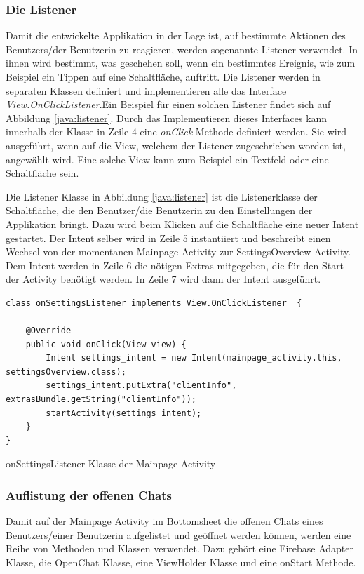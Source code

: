 \documentclass[a4paper,11pt]{report}
\newenvironment{code}{\captionsetup{type=figure}}{}
\begin{document}
			\subsubsection{Die Listener}
			Damit die entwickelte Applikation in der Lage ist, auf bestimmte Aktionen des Benutzers/der Benutzerin zu reagieren, werden sogenannte Listener verwendet. In ihnen wird bestimmt, was geschehen soll, wenn ein bestimmtes Ereignis, wie zum Beispiel ein Tippen auf eine Schaltfläche, auftritt. Die Listener werden in separaten Klassen definiert und implementieren alle das Interface \emph{View.OnClickListener}.Ein Beispiel für einen solchen Listener findet sich auf Abbildung \ref{java:listener}. Durch das Implementieren dieses Interfaces kann innerhalb der Klasse in Zeile 4 eine \emph{onClick} Methode definiert werden. Sie wird ausgeführt, wenn auf die View, welchem der Listener zugeschrieben worden ist, angewählt wird. Eine solche View kann zum Beispiel ein Textfeld oder eine Schaltfläche sein. 
			
			Die Listener Klasse in Abbildung \ref{java:listener} ist die Listenerklasse der Schaltfläche, die den Benutzer/die Benutzerin zu den Einstellungen der Applikation bringt. Dazu wird beim Klicken auf die Schaltfläche eine neuer Intent gestartet. Der Intent selber wird in Zeile 5 instantiiert und beschreibt einen Wechsel von der momentanen Mainpage Activity zur SettingsOverview Activity. Dem Intent werden in Zeile 6 die nötigen Extras mitgegeben, die für den Start der Activity benötigt werden. In Zeile 7 wird dann der Intent ausgeführt.
\begin{code}
	\begin{center}
		\begin{verbatim}
class onSettingsListener implements View.OnClickListener  {

	@Override
	public void onClick(View view) {
		Intent settings_intent = new Intent(mainpage_activity.this, settingsOverview.class);
		settings_intent.putExtra("clientInfo", extrasBundle.getString("clientInfo"));
		startActivity(settings_intent);
	}
}
		\end{verbatim}
		\caption{onSettingsListener Klasse der Mainpage Activity}\label{java:listener}
	\end{center}
\end{code}
			
			\subsubsection{Auflistung der offenen Chats}
			Damit auf der Mainpage Activity im Bottomsheet die offenen Chats eines Benutzers/einer Benutzerin aufgelistet und geöffnet werden können, werden eine Reihe von Methoden und Klassen verwendet. Dazu gehört eine Firebase Adapter Klasse, die OpenChat Klasse, eine ViewHolder Klasse und eine onStart Methode. 
			
\end{document}
